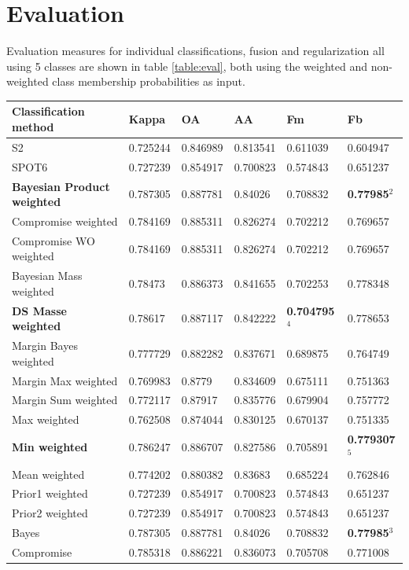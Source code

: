 \documentclass[10pt]{article}
\begin{document}
\section{Evaluation}
Evaluation measures for individual classifications, fusion and regularization all using 5 classes are shown in table \ref{table:eval}, both using the weighted and non-weighted class membership probabilities as input.
\begin{table}[H]
\centering
\begin{tabular}{llllll}\toprule
\textbf{Classification method} & \textbf{Kappa} & \textbf{OA} & \textbf{AA} & \textbf{Fm} & \textbf{Fb}\\\hline
S2 & 0.725244 & 0.846989 & 0.813541 & 0.611039 & 0.604947\\
SPOT6 & 0.727239 & 0.854917 & 0.700823 & 0.574843 & 0.651237\\\hline
\textbf{Bayesian Product weighted} & 0.787305 & 0.887781 & 0.84026 & 0.708832 & \textbf{0.77985$^2$}\\
Compromise weighted & 0.784169 & 0.885311 & 0.826274 & 0.702212 & 0.769657\\
Compromise WO weighted & 0.784169 & 0.885311 & 0.826274 & 0.702212 & 0.769657\\
Bayesian Mass weighted & 0.78473 & 0.886373 & 0.841655 & 0.702253 & 0.778348\\
\textbf{DS Masse weighted} & 0.78617 & 0.887117 & 0.842222 & \textbf{0.704795$^4$} & 0.778653\\
Margin Bayes weighted & 0.777729 & 0.882282 & 0.837671 & 0.689875 & 0.764749\\
Margin Max weighted & 0.769983 & 0.8779 & 0.834609 & 0.675111 & 0.751363\\
Margin Sum weighted & 0.772117 & 0.87917 & 0.835776 & 0.679904 & 0.757772\\
Max weighted & 0.762508 & 0.874044 & 0.830125 & 0.670137 & 0.751335\\
\textbf{Min weighted} & 0.786247 & 0.886707 & 0.827586 & 0.705891 & \textbf{0.779307$^5$}\\
Mean weighted & 0.774202 & 0.880382 & 0.83683 & 0.685224 & 0.762846\\
Prior1 weighted & 0.727239 & 0.854917 & 0.700823 & 0.574843 & 0.651237\\
Prior2 weighted & 0.727239 & 0.854917 & 0.700823 & 0.574843 & 0.651237\\\hline
Bayes & 0.787305 & 0.887781 & 0.84026 & 0.708832 & \textbf{0.77985$^3$}\\
Compromise & 0.785318 & 0.886221 & 0.836073 & 0.705708 & 0.771008\\

\end{tabular}
\end{table}
\end{document}
